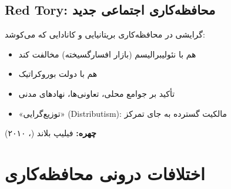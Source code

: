 \subsection{Red Tory: محافظه‌کاری اجتماعی جدید}

\begin{defbox}
گرایشی در محافظه‌کاری بریتانیایی و کانادایی که می‌کوشد:
\begin{itemize}[nosep]
    \item هم با نئولیبرالیسم (بازار افسارگسیخته) مخالفت کند
    \item هم با دولت بوروکراتیک
    \item تأکید بر جوامع محلی، تعاونی‌ها، نهادهای مدنی
    \item «توزیع‌گرایی» (Distributism): مالکیت گسترده به جای تمرکز
\end{itemize}
\textbf{چهره:} فیلیپ بلاند (، ۲۰۱۰)
\end{defbox}

\section{اختلافات درونی محافظه‌کاری}

